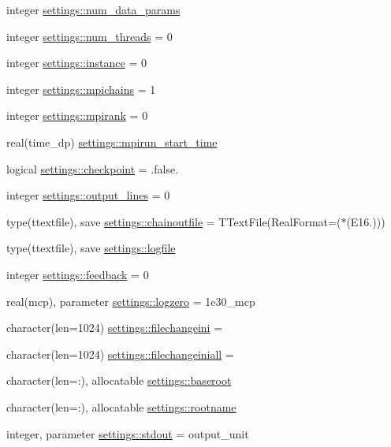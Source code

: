\begin{DoxyCompactItemize}
\item 
integer \mbox{\hyperlink{namespacesettings_a588b630a77c6cf16ccd63096b5ac4507}{settings\+::num\+\_\+data\+\_\+params}}
\item 
integer \mbox{\hyperlink{namespacesettings_a004f5c3efc3e9d33a1a4526f5a20785b}{settings\+::num\+\_\+threads}} = 0
\item 
integer \mbox{\hyperlink{namespacesettings_a8b396bca0192e0a92363a9cf6b942542}{settings\+::instance}} = 0
\item 
integer \mbox{\hyperlink{namespacesettings_a9cb321eeb7d7d329d5d99cba2595330d}{settings\+::mpichains}} = 1
\item 
integer \mbox{\hyperlink{namespacesettings_ad6fd77f9480fb92754b6f5890017e594}{settings\+::mpirank}} = 0
\item 
real(time\+\_\+dp) \mbox{\hyperlink{namespacesettings_afe15c9b4b37c62135a2e5d12810b92bc}{settings\+::mpirun\+\_\+start\+\_\+time}}
\item 
logical \mbox{\hyperlink{namespacesettings_ae0817081d233f3c5d76fad556a766afb}{settings\+::checkpoint}} = .false.
\item 
integer \mbox{\hyperlink{namespacesettings_a8d398d8d6e0a5435eb847608d0147f12}{settings\+::output\+\_\+lines}} = 0
\item 
type(ttextfile), save \mbox{\hyperlink{namespacesettings_a45cb647c4940062ae812ef3a374e5e2f}{settings\+::chainoutfile}} = T\+Text\+File(Real\+Format=\textquotesingle{}($\ast$(E16.))\textquotesingle{})
\item 
type(ttextfile), save \mbox{\hyperlink{namespacesettings_abf81803341f16be48aa42058423f085b}{settings\+::logfile}}
\item 
integer \mbox{\hyperlink{namespacesettings_a34e44606ac3e84f06e2696f74542f664}{settings\+::feedback}} = 0
\item 
real(mcp), parameter \mbox{\hyperlink{namespacesettings_a057b984bb501467c33dbcc3ffc3a34d3}{settings\+::logzero}} = 1e30\+\_\+mcp
\item 
character(len=1024) \mbox{\hyperlink{namespacesettings_ae3545d47de8db723b192e3bc79f95e99}{settings\+::filechangeini}} = \textquotesingle{}\textquotesingle{}
\item 
character(len=1024) \mbox{\hyperlink{namespacesettings_aa364554c9b5868156913823eaa6b5185}{settings\+::filechangeiniall}} = \textquotesingle{}\textquotesingle{}
\item 
character(len=\+:), allocatable \mbox{\hyperlink{namespacesettings_aa942779910692a37fbc12dd25f62877e}{settings\+::baseroot}}
\item 
character(len=\+:), allocatable \mbox{\hyperlink{namespacesettings_a4a3bc0d40d0532bc2f7f2cc87170068a}{settings\+::rootname}}
\item 
integer, parameter \mbox{\hyperlink{namespacesettings_af5b1a69ec3d96be977d23b1e59e7d36e}{settings\+::stdout}} = output\+\_\+unit
\end{DoxyCompactItemize}
